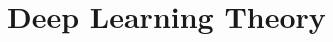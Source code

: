 \documentclass[./main.tex]{subfiles}
\begin{document}
\section{Deep Learning Theory}
\end{document}
